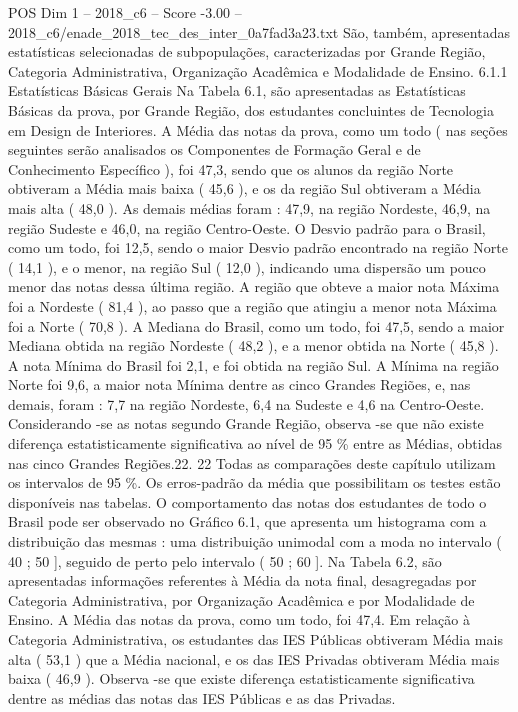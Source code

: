 \begin{textsample}{POS Dim 1 – 2018\_c6 – Score -3.00 – 2018\_c6/enade\_2018\_tec\_des\_inter\_0a7fad3a23.txt}
São, também, apresentadas estatísticas selecionadas de subpopulações, caracterizadas por Grande Região, Categoria Administrativa, Organização Acadêmica e Modalidade de Ensino. 6.1.1 Estatísticas Básicas Gerais Na Tabela 6.1, são apresentadas as Estatísticas Básicas da prova, por Grande Região, dos estudantes concluintes de Tecnologia em Design de Interiores.
A Média das notas da prova, como um todo ( nas seções seguintes serão analisados os Componentes de Formação Geral e de Conhecimento Específico ), foi 47,3, sendo que os alunos da região Norte obtiveram a Média mais baixa ( 45,6 ), e os da região Sul obtiveram a Média mais alta ( 48,0 ).
As demais médias foram : 47,9, na região Nordeste, 46,9, na região Sudeste e 46,0, na região Centro-Oeste.
O Desvio padrão para o Brasil, como um todo, foi 12,5, sendo o maior Desvio padrão encontrado na região Norte ( 14,1 ), e o menor, na região Sul ( 12,0 ), indicando uma dispersão um pouco menor das notas dessa última região.
A região que obteve a maior nota Máxima foi a Nordeste ( 81,4 ), ao passo que a região que atingiu a menor nota Máxima foi a Norte ( 70,8 ).
A Mediana do Brasil, como um todo, foi 47,5, sendo a maior Mediana obtida na região Nordeste ( 48,2 ), e a menor obtida na Norte ( 45,8 ).
A nota Mínima do Brasil foi 2,1, e foi obtida na região Sul.
A Mínima na região Norte foi 9,6, a maior nota Mínima dentre as cinco Grandes Regiões, e, nas demais, foram : 7,7 na região Nordeste, 6,4 na Sudeste e 4,6 na Centro-Oeste.
Considerando -se as notas segundo Grande Região, observa -se que não existe diferença estatisticamente significativa ao nível de 95 \% entre as Médias, obtidas nas cinco Grandes Regiões.22. 22 Todas as comparações deste capítulo utilizam os intervalos de 95 \%.
Os erros-padrão da média que possibilitam os testes estão disponíveis nas tabelas.
O comportamento das notas dos estudantes de todo o Brasil pode ser observado no Gráfico 6.1, que apresenta um histograma com a distribuição das mesmas : uma distribuição unimodal com a moda no intervalo ( 40 ; 50 ], seguido de perto pelo intervalo ( 50 ; 60 ].
Na Tabela 6.2, são apresentadas informações referentes à Média da nota final, desagregadas por Categoria Administrativa, por Organização Acadêmica e por Modalidade de Ensino.
A Média das notas da prova, como um todo, foi 47,4.
Em relação à Categoria Administrativa, os estudantes das IES Públicas obtiveram Média mais alta ( 53,1 ) que a Média nacional, e os das IES Privadas obtiveram Média mais baixa ( 46,9 ).
Observa -se que existe diferença estatisticamente significativa dentre as médias das notas das IES Públicas e as das Privadas.

\end{textsample}
